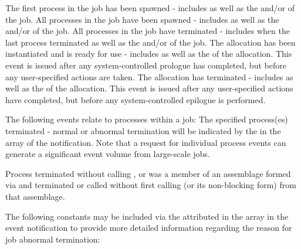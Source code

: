 \begin{constantdesc}

%
The first process in the job has been spawned - includes  as well as the  and/or  of the job.
%
All processes in the job have been spawned - includes  as well as the  and/or  of the job.
%
All processes in the job have terminated - includes  when the last process terminated as well as the  and/or  of the job.
%
The allocation has been instantiated and is ready for use - includes  as well as the  of the allocation. This event is issued after any system-controlled prologue has completed, but before any user-specified actions are taken.
%
The allocation has terminated - includes  as well as the  of the allocation. This event is issued after any user-specified actions have completed, but before any system-controlled epilogue is performed.

The following events relate to processes within a job:
%
The specified process(es) terminated - normal or abnormal
termination will be indicated by the  in the
 array of the notification. Note that a request for individual
process events can generate a significant event volume from large-scale jobs.

%
Process terminated without calling , or was a member of an assemblage formed via  and terminated or called  without first calling  (or its non-blocking form) from that assemblage.

The following constants may be included via the
 attributed in the  array in the
 event notification to provide more detailed
information regarding the reason for job abnormal termination:


\end{constantdesc}
